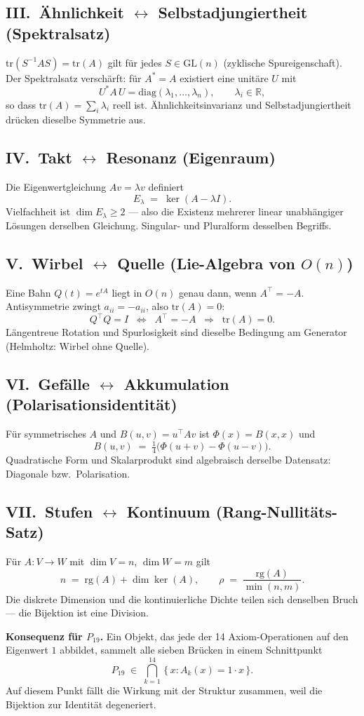 \documentclass[11pt,a4paper]{article}
\begin{document}
\subsection*{III.\ Ähnlichkeit $\leftrightarrow$ Selbstadjungiertheit
  (Spektralsatz)}
$\mathrm{tr}(S^{-1} A S) = \mathrm{tr}(A)$ gilt für jedes
$S\in\mathrm{GL}(n)$ (zyklische Spureigenschaft). Der Spektralsatz
verschärft: für $A^\ast = A$ existiert eine unitäre $U$ mit
\[
  U^\ast A\, U = \mathrm{diag}(\lambda_1,\dots,\lambda_n),
  \qquad \lambda_i \in \mathbb{R},
\]
so dass $\mathrm{tr}(A) = \sum_i \lambda_i$ reell ist.
Ähnlichkeitsinvarianz und Selbstadjungiertheit drücken dieselbe
Symmetrie aus.

\subsection*{IV.\ Takt $\leftrightarrow$ Resonanz (Eigenraum)}
Die Eigenwertgleichung $A v = \lambda v$ definiert
\[
  E_\lambda \;=\; \ker(A - \lambda I).
\]
Vielfachheit ist $\dim E_\lambda \geq 2$ --- also die Existenz
mehrerer linear unabhängiger Lösungen derselben Gleichung.
Singular- und Pluralform desselben Begriffs.

\subsection*{V.\ Wirbel $\leftrightarrow$ Quelle (Lie-Algebra
  von $O(n)$)}
Eine Bahn $Q(t) = e^{tA}$ liegt in $O(n)$ genau dann, wenn
$A^\top = -A$. Antisymmetrie zwingt $a_{ii} = -a_{ii}$, also
$\mathrm{tr}(A) = 0$:
\[
  Q^\top Q = I \;\;\Longleftrightarrow\;\; A^\top = -A
  \;\;\Longrightarrow\;\; \mathrm{tr}(A) = 0.
\]
Längentreue Rotation und Spurlosigkeit sind dieselbe Bedingung
am Generator (Helmholtz: Wirbel ohne Quelle).

\subsection*{VI.\ Gefälle $\leftrightarrow$ Akkumulation
  (Polarisationsidentität)}
Für symmetrisches $A$ und $B(u,v) = u^\top A v$ ist
$\Phi(x) = B(x,x)$ und
\[
  B(u,v) \;=\; \tfrac14\bigl(\Phi(u+v) - \Phi(u-v)\bigr).
\]
Quadratische Form und Skalarprodukt sind algebraisch derselbe
Datensatz: Diagonale bzw.\ Polarisation.

\subsection*{VII.\ Stufen $\leftrightarrow$ Kontinuum
  (Rang-Nullitäts-Satz)}
Für $A\colon V\to W$ mit $\dim V = n$, $\dim W = m$ gilt
\[
  n \;=\; \mathrm{rg}(A) + \dim\ker(A),
  \qquad
  \rho \;=\; \frac{\mathrm{rg}(A)}{\min(n,m)}.
\]
Die diskrete Dimension und die kontinuierliche Dichte teilen
sich denselben Bruch --- die Bijektion ist eine Division.

\bigskip
\noindent\textbf{Konsequenz für $P_{19}$.}
Ein Objekt, das jede der 14 Axiom-Operationen auf den Eigenwert $1$
abbildet, sammelt alle sieben Brücken in einem Schnittpunkt
$$
  P_{19} \;\in\; \bigcap_{k=1}^{14}\,\{\,x : A_k(x) = 1\cdot x\,\}.
$$
Auf diesem Punkt fällt die Wirkung mit der Struktur zusammen, weil
die Bijektion zur Identität degeneriert.
\end{document}
